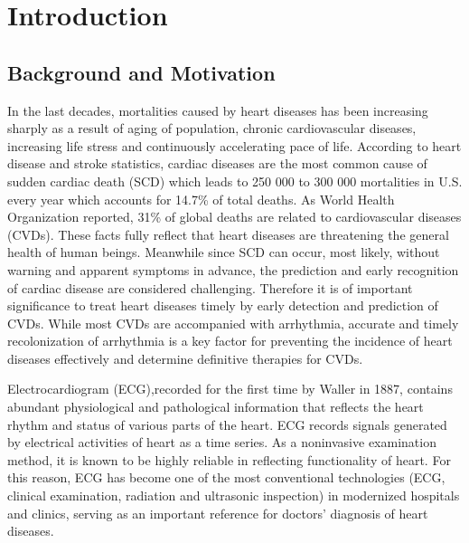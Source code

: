  \chapter{Introduction}

 \section{Background and Motivation}
 
In the last decades, mortalities caused by heart diseases has been increasing sharply as a result of aging of population, chronic cardiovascular diseases, increasing life stress and continuously accelerating pace of life\cite{mortality}. According to heart disease and stroke statistics, cardiac diseases are the most common cause of sudden cardiac death (SCD) which leads to 250 000 to 300 000 mortalities in U.S. every year which accounts for 14.7\% of total deaths\cite{SCDnumber}. As World Health Organization reported, 31\% of global deaths are related to cardiovascular diseases (CVDs)\cite{who}. %
These facts fully reflect that heart diseases are threatening the general health of human beings. Meanwhile since SCD can occur, most likely, without warning and apparent symptoms in advance, the prediction and early recognition of cardiac disease are considered challenging\cite{circulation2010}. Therefore it is of important significance to treat heart diseases timely by early detection and prediction of CVDs. 
While most CVDs are accompanied with arrhythmia, accurate and timely recolonization of arrhythmia is a key factor for preventing the incidence of heart diseases effectively and determine definitive therapies for CVDs.

Electrocardiogram (ECG),recorded for the first time by Waller in 1887, contains abundant physiological and pathological information that reflects the heart rhythm and status of various parts of the heart\cite{besterman1979waller}. %
 ECG records signals generated by electrical activities of heart as a time series. As a noninvasive examination method, it is known to be highly reliable in reflecting functionality of heart. For this reason, ECG has become one of the most conventional technologies (ECG, clinical examination, radiation and ultrasonic inspection) in modernized hospitals and clinics, serving as an important reference for doctors’ diagnosis of heart diseases.


